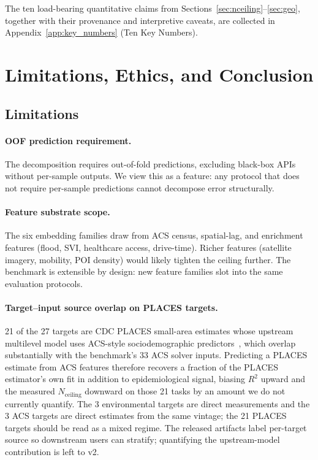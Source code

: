 \documentclass{article}
\begin{document}
The ten load-bearing quantitative claims from Sections~\ref{sec:nceiling}--\ref{sec:geo}, together with their provenance and interpretive caveats, are collected in Appendix~\ref{app:key_numbers} (Ten Key Numbers).

\section{Limitations, Ethics, and Conclusion}
\label{sec:conclusion}

\subsection{Limitations}

\paragraph{OOF prediction requirement.} The decomposition requires out-of-fold predictions, excluding black-box APIs without per-sample outputs. We view this as a feature: any protocol that does not require per-sample predictions cannot decompose error structurally.


\paragraph{Feature substrate scope.} The six embedding families draw from ACS census, spatial-lag, and enrichment features (flood, SVI, healthcare access, drive-time). Richer features (satellite imagery, mobility, POI density) would likely tighten the ceiling further. The benchmark is extensible by design: new feature families slot into the same evaluation protocols.

\paragraph{Target--input source overlap on PLACES targets.} 21 of the 27 targets are CDC PLACES small-area estimates whose upstream multilevel model uses ACS-style sociodemographic predictors~\citep{cdcplaces2025methodology}, which overlap substantially with the benchmark's 33 ACS solver inputs. Predicting a PLACES estimate from ACS features therefore recovers a fraction of the PLACES estimator's own fit in addition to epidemiological signal, biasing $R^2$ upward and the measured $N_{\text{ceiling}}$ downward on those 21 tasks by an amount we do not currently quantify. The 3 environmental targets are direct measurements and the 3 ACS targets are direct estimates from the same vintage; the 21 PLACES targets should be read as a mixed regime. The released artifacts label per-target source so downstream users can stratify; quantifying the upstream-model contribution is left to v2.
\end{document}
